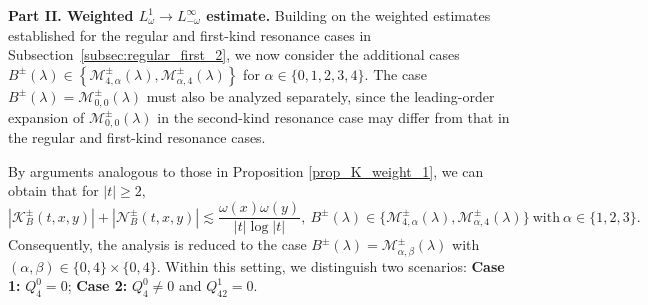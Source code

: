 \documentclass[reqno]{amsart}
\numberwithin{equation}{section}
\begin{document}
\vspace{2mm}  
\textbf{Part II. Weighted $L^1_\omega \to L^\infty_{-\omega}$ estimate.} 
Building on the weighted estimates established for the regular and
first-kind resonance cases in
Subsection~\ref{subsec:regular_first_2}, we now consider the additional cases
$
B^\pm(\lambda)\in
\left\{
\mathcal M_{4,\alpha}^\pm(\lambda),
\mathcal M_{\alpha,4}^\pm(\lambda)
\right\}$ for
$\alpha\in\{0,1,2,3,4\}.$
The case
$
B^\pm(\lambda)=\mathcal M_{0,0}^\pm(\lambda)
$
must also be analyzed separately, since the leading-order expansion
of $\mathcal M_{0,0}^\pm(\lambda)$ in the second-kind resonance case may differ from that in the regular
and first-kind resonance cases.


 By arguments analogous to those in Proposition \ref{prop_K_weight_1}, we can obtain that for $|t|\ge 2,$
\begin{equation}\label{eq:fast_decay}  
\left| \mathcal{K}_{B}^\pm(t,x,y)\right| +
\left|\mathcal{N}_{B}^\pm(t,x,y)\right| \lesssim \frac{\omega(x)\omega(y)}{|t|\log |t|}, \  B^\pm(\lambda) \in \{\mathcal{M}_{4,\alpha}^{\pm}(\lambda), \mathcal{M}_{\alpha,4}^{\pm}(\lambda)\}\ \text{with}\ \alpha \in \{1,2,3\}.  
\end{equation}  
Consequently, the analysis is reduced to the case
$B^\pm(\lambda)= \mathcal{M}_{\alpha,\beta}^{\pm}(\lambda)$
with $(\alpha,\beta) \in \{0,4\} \times \{0,4\}$.
Within this setting, we distinguish two scenarios:
\textbf{Case 1:} $Q_4^0 = 0$;
\textbf{Case 2:} $Q_4^0 \neq 0$ and $Q_{42}^1 = 0$. 
\end{document}

